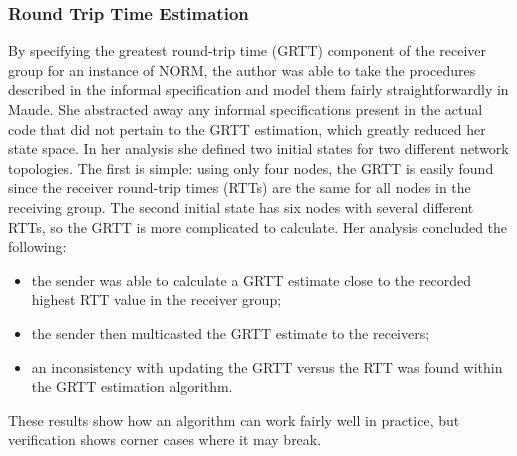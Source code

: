 \documentclass[11pt, journal]{IEEEtran}
\begin{document}
\subsubsection{Round Trip Time Estimation}
By specifying the greatest round-trip time (GRTT) component of the receiver group for an instance of NORM, the author was able to take the procedures described in the informal specification and model them fairly straightforwardly in Maude. She abstracted away any informal specifications present in the actual code that did not pertain to the GRTT estimation, which greatly reduced her state space.
\bigbreak
In her analysis she defined two initial states for two different network topologies. The first is simple: using only four nodes, the GRTT is easily found since the receiver round-trip times (RTTs) are the same for all nodes in the receiving group. The second initial state has six nodes with several different RTTs, so the GRTT is more complicated to calculate. Her analysis concluded the following: \begin{itemize}
	\item the sender was able to calculate a GRTT estimate close to the recorded highest RTT value in the receiver group;
	\item the sender then multicasted the GRTT estimate to the receivers;
	\item an inconsistency with updating the GRTT versus the RTT was found within the GRTT estimation algorithm.
\end{itemize}
These results show how an algorithm can work fairly well in practice, but verification shows corner cases where it may break.
\bigbreak
\end{document}
